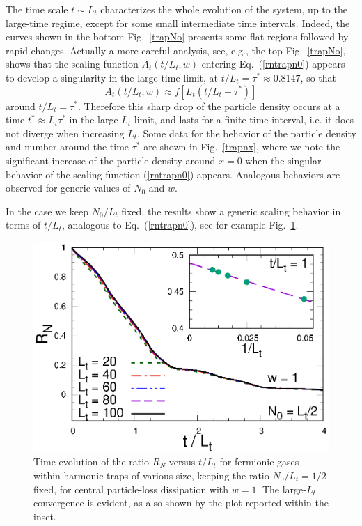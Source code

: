   The time scale $t\sim L_t$ characterizes the whole evolution of the
  system, up to the large-time regime, except for some small
  intermediate time intervals. Indeed, the curves shown in the bottom
  Fig.~\ref{trapNo} presents some flat regions followed by rapid
  changes.  Actually a more careful analysis, see, e.g., the top
  Fig.~\ref{trapNo}, shows that the scaling function $A_t(t/L_t,w)$
  entering Eq.~(\ref{rntrapn0}) appears to develop a singularity in the
  large-time limit, at $t/L_t = \tau^*\approx 0.8147$, so that
  \begin{equation}
    A_t(t/L_t,w) \approx f[L_t (t/L_t-\tau^*)]
    \label{atcrit}
  \end{equation}
  around $t/L_t=\tau^*$. Therefore this sharp drop of the particle
  density occurs at a time $t^* \approx L_t \tau^*$ in the large-$L_t$
  limit, and lasts for a finite time interval, i.e. it does not diverge
  when increasing $L_t$.  Some data for the behavior of the particle
  density and number around the time $\tau^*$ are shown in
  Fig.~\ref{trapnx}, where we note the significant increase of the
  particle density around $x=0$ when the singular behavior of the
  scaling function (\ref{rntrapn0}) appears.  Analogous behaviors are
  observed for generic values of $N_0$ and $w$.
  
  
  In the case we keep $N_0/L_t$ fixed, the results show a generic
  scaling behavior in terms of $t/L_t$, analogous to
  Eq.~(\ref{rntrapn0}), see for example Fig.~\ref{trapNoLt}.
  
  
  
  
  
  
  \begin{figure}[!htb]
\centering
  \includegraphics[width=0.65\columnwidth]{imm/RNtrapNoLt.eps}
  \caption{ Time evolution of the ratio $R_N$ versus $t/L_t$ for
    fermionic gases within harmonic traps of various size, keeping the
    ratio $N_0/L_t=1/2$ fixed, for central particle-loss dissipation with
    $w=1$. The  large-$L_t$ convergence is evident, as also shown by
    the plot reported within the inset. }
  \label{trapNoLt}
  \end{figure}
  